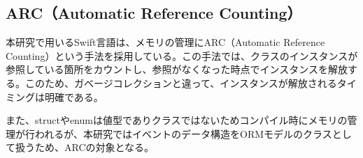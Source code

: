 \documentclass[../../../main]{subfiles}
\begin{document}
    \subsection{ARC（Automatic Reference Counting）}\label{subsec:phraseology-arc}
    本研究で用いるSwift言語は、メモリの管理にARC（Automatic Reference Counting）という手法を採用している。この手法では、クラスのインスタンスが参照している箇所をカウントし、参照がなくなった時点でインスタンスを解放する。このため、ガベージコレクションと違って、インスタンスが解放されるタイミングは明確である。

    また、structやenumは値型でありクラスではないためコンパイル時にメモリの管理が行われるが、本研究ではイベントのデータ構造をORMモデルのクラスとして扱うため、ARCの対象となる。\cite{ARC}
\end{document}
